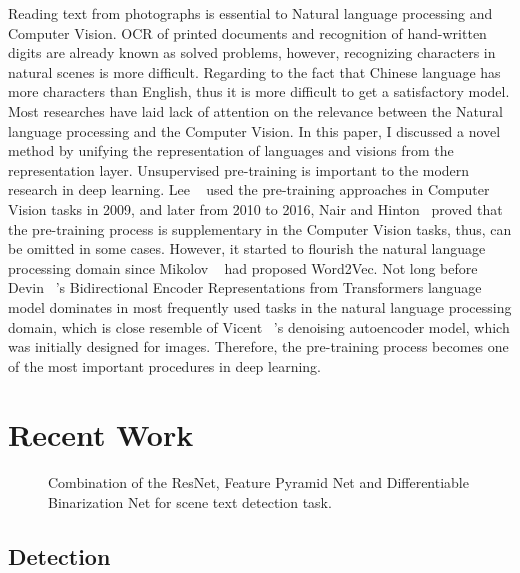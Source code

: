 \documentclass[review]{cvpr}
\begin{document}
  Reading text from photographs is essential to Natural language processing and Computer Vision.
  OCR of printed documents and recognition of hand-written digits are already known as solved problems,
  however, recognizing characters in natural scenes is more difficult.
  Regarding to the fact that Chinese language has more characters than English, thus it is more difficult to get a satisfactory model.
  Most researches have laid lack of attention on the relevance between the Natural language processing and the Computer Vision.
  In this paper, I discussed a novel method by unifying the representation of languages and visions from the representation layer.
  Unsupervised pre-training is important to the modern research in deep learning.
  Lee \etal~\cite{lee2009convolutional} used the pre-training approaches
  in Computer Vision tasks in 2009, and later from 2010 to 2016,
  Nair and Hinton~\cite{nair2010rectified} proved that the pre-training process is supplementary in the Computer Vision tasks,
  thus, can be omitted in some cases.
  However, it started to flourish the natural language processing domain since Mikolov \etal~\cite{mikolov2013distributed} had proposed Word2Vec.
  Not long before Devin \etal~\cite{devlin2019bert}'s Bidirectional Encoder Representations from Transformers language model dominates
  in most frequently used tasks in the natural language processing domain,
  which is close resemble of Vicent \etal~\cite{vincent2008extracting}'s denoising autoencoder model, which was initially designed for images.
  Therefore, the pre-training process becomes one of the most important procedures in deep learning.


\section{Recent Work}

\begin{figure*}
\begin{center}
\end{center}
   \caption{Combination of the ResNet, Feature Pyramid Net and Differentiable Binarization Net for scene text detection task.}
\label{fig:short}
\end{figure*}

\subsection{Detection}
\end{document}
